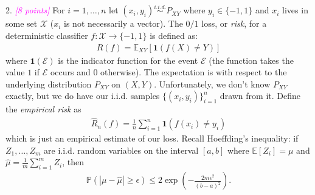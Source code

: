 \documentclass{article}
\newcommand{\1}{\mathbf{1}}
\newcommand{\E}{\mathbb{E}} %
\renewcommand{\P}{\mathbb{P}} %
\newcommand{\grade}[1]{\small\textcolor{magenta}{\emph{[#1 points]}} \normalsize}
\begin{document}
\section*{}
2. \grade{8} 
For $i=1,\dots,n$ let $(x_i,y_i) \overset{i.i.d.}{\sim} P_{XY}$ where $y_i \in \{-1,1\}$ and $x_i$ lives in some set $\mathcal{X}$ ($x_i$ is not necessarily a vector). 
The $0/1$ loss, or \emph{risk}, for a deterministic classifier $f:\mathcal{X} \rightarrow \{ -1,1 \}$ is defined as:
\begin{align*}
R(f) = \mathbb E_{XY} [\1(f(X)\neq Y)]
\end{align*}
where $\1(\mathcal{E})$ is the indicator function for the event $\mathcal{E}$ (the
function takes the value $1$ if $\mathcal{E}$ occurs and $0$ otherwise).
The expectation is with respect to the underlying distribution $P_{XY}$ on $(X,Y)$.
Unfortunately, we don't know $P_{XY}$ exactly, but we do have our i.i.d. samples $\{(x_i,y_i)\}_{i=1}^n$ drawn from it.
Define the \emph{empirical risk} as 
\begin{align*}
\widehat R_n(f) = \frac{1}{n} \sum_{i=1}^n \mathbf{1}(f(x_i)\neq y_i) 
\end{align*}
which is just an empirical estimate of our loss.
Recall Hoeffding's inequality: if $Z_1,\dots,Z_m$ are i.i.d. random variables on the interval $[a,b]$ where $\E[Z_i] = \mu$ and $\widehat{\mu} = \frac{1}{m} \sum_{i=1}^m Z_i$, then 
\begin{align*}
\P\left( |\mu - \widehat{\mu}| \geq \epsilon \right) \leq 2 \exp\left(- \frac{2 m \epsilon^2}{(b-a)^2}\right).
\end{align*}
\end{document}
